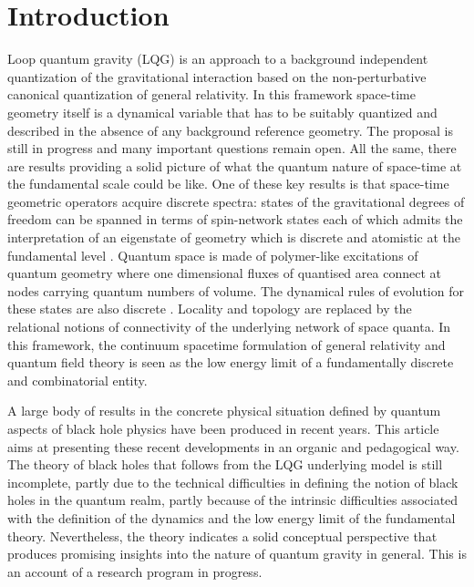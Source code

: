\documentclass[aps, nofootinbib,superscriptaddress,12pt]{revtex4-2}
\begin{document}
\newpage

\section{Introduction} 

Loop quantum gravity (LQG) is an approach to a background independent quantization of the gravitational interaction
based on the non-perturbative canonical quantization of general relativity.   In this framework space-time geometry itself is a dynamical variable that has to be suitably quantized and described in the absence of any background reference geometry. The proposal is still in progress and many important questions remain open. All the same, there are results providing a solid picture of what the quantum nature of space-time at the fundamental scale could be like. One of these key results is that space-time geometric operators acquire discrete spectra: states of the gravitational degrees of freedom can be spanned in terms of spin-network states  each of which admits the interpretation of an eigenstate of geometry which is discrete and atomistic at the fundamental level \cite{Rovelli:1994ge, Ashtekar:1996eg, Ashtekar:1997fb}. Quantum space is made of polymer-like excitations of quantum geometry where one dimensional fluxes of quantised area connect at nodes carrying quantum numbers of volume. The dynamical rules of evolution for these states are also discrete \cite{Perez:2012wv}. Locality and topology are replaced by the relational notions of connectivity of the underlying network of space quanta.  In this framework, the continuum spacetime formulation of general relativity and quantum field theory is seen as the low energy limit of a fundamentally discrete and combinatorial entity.
 
A large body of results in the concrete physical situation defined by quantum aspects of black hole physics have been produced in recent years.  This article aims at presenting these recent developments in an organic and pedagogical way.
The theory of black holes that follows from the LQG underlying model is still incomplete, partly due to the technical difficulties in defining the notion of black holes in the quantum realm, partly because of the intrinsic difficulties associated with the definition of the dynamics and the low energy limit of the fundamental theory.  Nevertheless, the theory indicates a solid conceptual perspective that produces promising insights into the nature of quantum gravity in general. This is an account of a research program in progress.  
\end{document}
